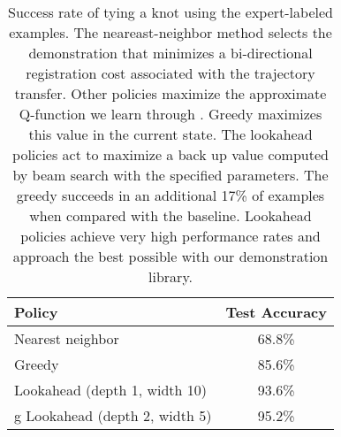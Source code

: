 \begin{table}
  \centering
  \begin{tabular}{lc}
    \toprule
      Policy & Test Accuracy\\
    \midrule
      Nearest neighbor \cite{Schulmanetal_ISRR2013} & 68.8\% \\
    \midrule
      Greedy & 85.6\% \\
      Lookahead (depth 1, width 10) & 93.6\% \\g
      Lookahead (depth 2, width 5) & 95.2\% \\
    \bottomrule
  \end{tabular}
  \caption{Success rate of tying a knot using the expert-labeled examples. The neareast-neighbor method selects
           the demonstration that minimizes a bi-directional registration cost associated with the trajectory transfer.
           Other policies maximize the approximate Q-function we learn through \mmql{}. Greedy maximizes this value in the current
           state. The lookahead policies act to maximize a back up value computed by beam search with the specified parameters. The greedy
           succeeds in an additional 17\% of examples when compared with the baseline. Lookahead policies achieve very high performance rates
           and approach the best possible with our demonstration library.}
  \label{table:performance}
\end{table}

